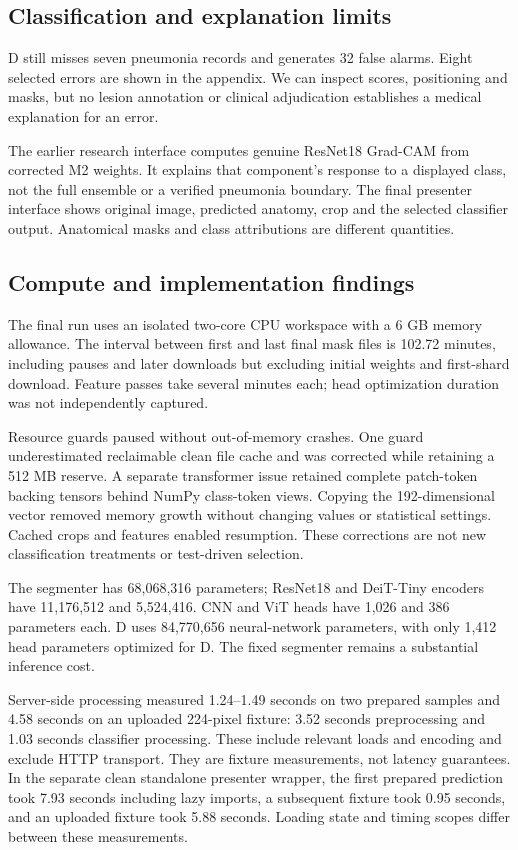 \documentclass[conference]{IEEEtran}
\begin{document}
\subsection{Classification and explanation limits}
D still misses seven pneumonia records and generates 32 false alarms. Eight selected errors are shown in the appendix. We can inspect scores, positioning and masks, but no lesion annotation or clinical adjudication establishes a medical explanation for an error.

The earlier research interface computes genuine ResNet18 Grad-CAM from corrected M2 weights. It explains that component's response to a displayed class, not the full ensemble or a verified pneumonia boundary. The final presenter interface shows original image, predicted anatomy, crop and the selected classifier output. Anatomical masks and class attributions are different quantities.

\subsection{Compute and implementation findings}
The final run uses an isolated two-core CPU workspace with a 6 GB memory allowance. The interval between first and last final mask files is 102.72 minutes, including pauses and later downloads but excluding initial weights and first-shard download. Feature passes take several minutes each; head optimization duration was not independently captured.

Resource guards paused without out-of-memory crashes. One guard underestimated reclaimable clean file cache and was corrected while retaining a 512 MB reserve. A separate transformer issue retained complete patch-token backing tensors behind NumPy class-token views. Copying the 192-dimensional vector removed memory growth without changing values or statistical settings. Cached crops and features enabled resumption. These corrections are not new classification treatments or test-driven selection.

The segmenter has 68,068,316 parameters; ResNet18 and DeiT-Tiny encoders have 11,176,512 and 5,524,416. CNN and ViT heads have 1,026 and 386 parameters each. D uses 84,770,656 neural-network parameters, with only 1,412 head parameters optimized for D. The fixed segmenter remains a substantial inference cost.

Server-side processing measured 1.24--1.49 seconds on two prepared samples and 4.58 seconds on an uploaded 224-pixel fixture: 3.52 seconds preprocessing and 1.03 seconds classifier processing. These include relevant loads and encoding and exclude HTTP transport. They are fixture measurements, not latency guarantees. In the separate clean standalone presenter wrapper, the first prepared prediction took 7.93 seconds including lazy imports, a subsequent fixture took 0.95 seconds, and an uploaded fixture took 5.88 seconds. Loading state and timing scopes differ between these measurements.
\end{document}
